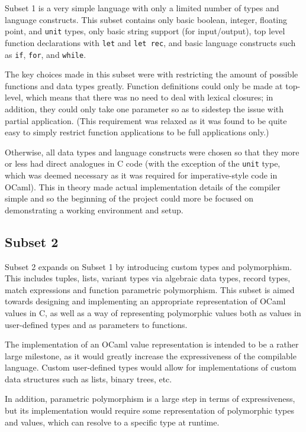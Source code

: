 \documentclass[12pt,a4paper,twoside,openright]{report}
\begin{document}
Subset 1 is a very simple language with only a limited number of types and 
language constructs. This subset contains only basic boolean, integer, floating 
point, and \texttt{unit} types, only basic string support (for input/output), 
top level function declarations with \texttt{let} and \texttt{let rec}, and 
basic language constructs such as \texttt{if}, \texttt{for}, and \texttt{while}.

The key choices made in this subset were with restricting the amount of 
possible functions and data types greatly. Function definitions could only be 
made at top-level, which means that there was no need to deal with lexical 
closures; in addition, they could only take one parameter so as to sidestep the 
issue with partial application. (This requirement was relaxed as it was found 
to be quite easy to simply restrict function applications to be full 
applications only.)

Otherwise, all data types and language constructs were chosen so that they more 
or less had direct analogues in C code (with the exception of the \texttt{unit} 
type, which was deemed necessary as it was required for imperative-style code 
in OCaml). This in theory made actual implementation details of the compiler 
simple and so the beginning of the project could more be focused on 
demonstrating a working environment and setup.

\subsection{Subset 2}

Subset 2 expands on Subset 1 by introducing custom types and polymorphism. This 
includes tuples, lists, variant types via algebraic data types, record types, 
match expressions and function parametric polymorphism. This subset is aimed 
towards designing and implementing an appropriate representation of OCaml 
values in C, as well as a way of representing polymorphic values both as values 
in user-defined types and as parameters to functions.

The implementation of an OCaml value representation is intended to be a rather 
large milestone, as it would greatly increase the expressiveness of the 
compilable language. Custom user-defined types would allow for implementations 
of custom data structures such as lists, binary trees, etc.

In addition, parametric polymorphism is a large step in terms of 
expressiveness, but its implementation would require some representation of 
polymorphic types and values, which can resolve to a specific type at runtime.
\end{document}
